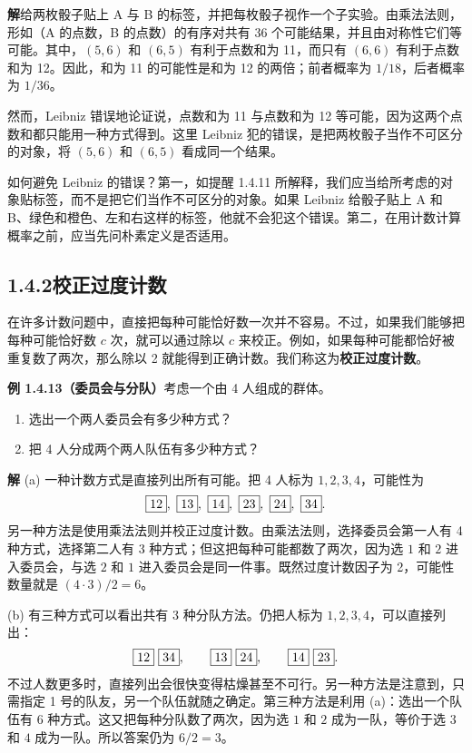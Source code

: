 \documentclass[UTF8,12pt,a4paper,fontset=fandol]{ctexart}
\begin{document}
\noindent\textbf{解}\quad 给两枚骰子贴上 A 与 B 的标签，并把每枚骰子视作一个子实验。由乘法法则，形如（A 的点数，B 的点数）的有序对共有 36 个可能结果，并且由对称性它们等可能。其中，$(5,6)$ 和 $(6,5)$ 有利于点数和为 11，而只有 $(6,6)$ 有利于点数和为 12。因此，和为 11 的可能性是和为 12 的两倍；前者概率为 $1/18$，后者概率为 $1/36$。

然而，Leibniz 错误地论证说，点数和为 11 与点数和为 12 等可能，因为这两个点数和都只能用一种方式得到。这里 Leibniz 犯的错误，是把两枚骰子当作不可区分的对象，将 $(5,6)$ 和 $(6,5)$ 看成同一个结果。

如何避免 Leibniz 的错误？第一，如提醒 1.4.11 所解释，我们应当给所考虑的对象贴标签，而不是把它们当作不可区分的对象。如果 Leibniz 给骰子贴上 A 和 B、绿色和橙色、左和右这样的标签，他就不会犯这个错误。第二，在用计数计算概率之前，应当先问朴素定义是否适用。

\subsection*{1.4.2\quad 校正过度计数}

在许多计数问题中，直接把每种可能恰好数一次并不容易。不过，如果我们能够把每种可能恰好数 $c$ 次，就可以通过除以 $c$ 来校正。例如，如果每种可能都恰好被重复数了两次，那么除以 2 就能得到正确计数。我们称这为\textbf{校正过度计数}。

\noindent\textbf{例 1.4.13（委员会与分队）}\quad 考虑一个由 4 人组成的群体。
\begin{enumerate}
  \item[(a)] 选出一个两人委员会有多少种方式？
  \item[(b)] 把 4 人分成两个两人队伍有多少种方式？
\end{enumerate}

\noindent\textbf{解}\quad
(a) 一种计数方式是直接列出所有可能。把 4 人标为 $1,2,3,4$，可能性为
\[
  \fbox{12},\ \fbox{13},\ \fbox{14},\ \fbox{23},\ \fbox{24},\ \fbox{34}.
\]
另一种方法是使用乘法法则并校正过度计数。由乘法法则，选择委员会第一人有 4 种方式，选择第二人有 3 种方式；但这把每种可能都数了两次，因为选 $1$ 和 $2$ 进入委员会，与选 $2$ 和 $1$ 进入委员会是同一件事。既然过度计数因子为 2，可能性数量就是 $(4\cdot 3)/2=6$。

(b) 有三种方式可以看出共有 3 种分队方法。仍把人标为 $1,2,3,4$，可以直接列出：
\[
  \fbox{12}\ \fbox{34},\qquad
  \fbox{13}\ \fbox{24},\qquad
  \fbox{14}\ \fbox{23}.
\]
不过人数更多时，直接列出会很快变得枯燥甚至不可行。另一种方法是注意到，只需指定 1 号的队友，另一个队伍就随之确定。第三种方法是利用 (a)：选出一个队伍有 6 种方式。这又把每种分队数了两次，因为选 $1$ 和 $2$ 成为一队，等价于选 $3$ 和 $4$ 成为一队。所以答案仍为 $6/2=3$。
\end{document}
